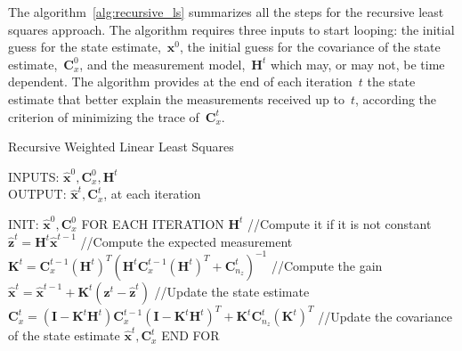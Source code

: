 The algorithm~\ref{alg:recursive_ls} summarizes all the steps for the recursive least squares approach. The algorithm requires three inputs to start looping: the initial guess for the state estimate,~$\mathbf{x}^0$, the initial guess for the covariance of the state estimate,~$\mathbf{C}^0_x$, and the measurement model,~$\mathbf{H}^t$ which may, or may not, be time dependent. The algorithm provides at the end of each iteration~$t$ the state estimate that better explain the measurements received up to~$t$, according the criterion of minimizing the trace of~$\mathbf{C}^t_x$.
\begin{algorithm}
\caption{Recursive Weighted Linear Least Squares}
INPUTS: $\hat{\mathbf{x}}^0,\mathbf{C}^0_x,\mathbf{H}^t$\\
OUTPUT: $\hat{\mathbf{x}}^t,\mathbf{C}^t_x$, at each iteration
\begin{algorithmic}
\STATE INIT: $\hat{\mathbf{x}}^0,\mathbf{C}^0_x$
\STATE FOR EACH ITERATION
\STATE \hspace{1cm} $\mathbf{H}^t$ //Compute it if it is not constant
\STATE \hspace{1cm} $\hat{\mathbf{z}}^t = \mathbf{H}^t\hat{\mathbf{x}}^{t-1}$ //Compute the expected measurement 
\STATE \hspace{1cm} $\mathbf{K}^t = \mathbf{C}^{t-1}_x(\mathbf{H}^t)^T(\mathbf{H}^t\mathbf{C}^{t-1}_x(\mathbf{H}^t)^T+\mathbf{C}^t_{n_z})^{-1}$ 
//Compute the gain
\STATE \hspace{1cm} $\hat{\mathbf{x}}^t = \hat{\mathbf{x}}^{t-1} + \mathbf{K}^t(\mathbf{z}^t - \hat{\mathbf{z}}^t)$ //Update the state estimate
\STATE \hspace{1cm} $\mathbf{C}^t_{x} = (\mathbf{I}-\mathbf{K}^t\mathbf{H}^t)\mathbf{C}^{t-1}_x(\mathbf{I}-\mathbf{K}^t\mathbf{H}^t)^T
		    + \mathbf{K}^t\mathbf{C}^t_{n_z}(\mathbf{K}^t)^T$ //Update the covariance of the state estimate
\RETURN $\hat{\mathbf{x}}^t,\mathbf{C}^t_x$		    
\STATE END FOR
\end{algorithmic}
\label{alg:recursive_ls}
\end{algorithm}

